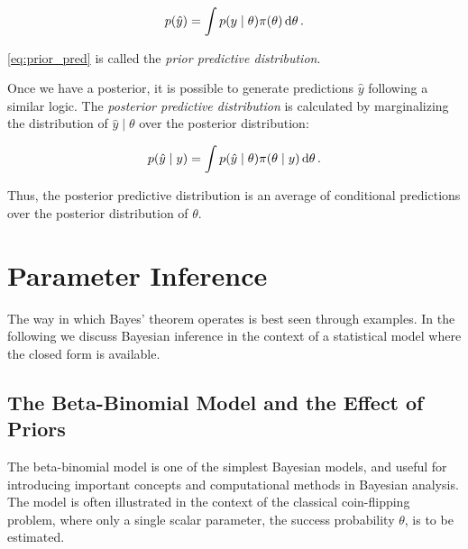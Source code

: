 \begin{equation}\label{eq:prior_pred}
    p \qty(\hat{y}) = \int p \qty(y \mid \theta) \pi \qty(\theta) \dd{\theta}.
\end{equation}

\autoref{eq:prior_pred} is called the \textit{prior predictive distribution}. 

Once we have a posterior, it is possible to generate predictions $\hat{y}$ following a similar logic. The \textit{posterior predictive distribution} is calculated by marginalizing the distribution of $\hat{y} \mid \theta$ over the posterior distribution: 

\begin{equation}\label{eq:post_pred}
    p \qty( \hat{y} \mid y ) =\int p \qty(\hat{y} \mid \theta) \pi \qty(\theta \mid y) \dd{\theta}.
\end{equation} 

Thus, the posterior predictive distribution is an average of conditional predictions over the posterior distribution of $\theta$.


\section{Parameter Inference}\label{sec:param_inference}

The way in which Bayes' theorem operates is best seen through examples. In the following we discuss Bayesian inference in the context of a statistical model where the closed form is available. %

\subsection{The Beta-Binomial Model and the Effect of Priors}\label{sec:coin_flipping}

The beta-binomial model is one of the simplest Bayesian models, and useful for introducing important concepts and computational methods in Bayesian analysis. The model is often illustrated in the context of the classical coin-flipping problem, where only a single scalar parameter, the success probability $\theta$, is to be estimated. 

